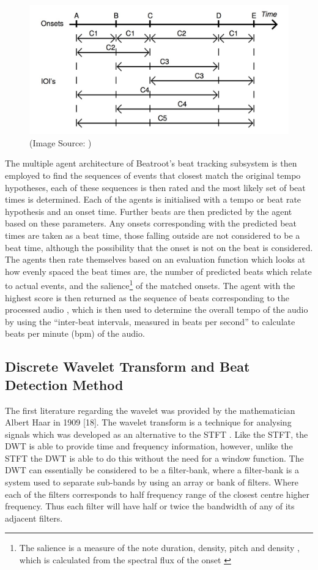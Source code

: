 \documentclass[a4paper, 11pt]{article}
\begin{document}
\begin{figure}[ht]
	\centering
	\includegraphics[scale=0.25]{br-clusters}
	\caption{(Image Source: \cite{dixon4})}
	\label{fig: br-clusters}
\end{figure}

The multiple agent architecture of Beatroot's beat tracking subsystem is then employed to find the sequences of events that closest match the original tempo hypotheses, each of these sequences is then rated and the most likely set of beat times is determined. Each of the agents is initialised with a tempo or beat rate hypothesis and an onset time. Further beats are then predicted by the agent based on these parameters. Any onsets corresponding with the predicted beat times are taken as a beat time, those falling outside are not considered to be a beat time, although the possibility that the onset is not on the beat is considered. The agents then rate themselves based on an evaluation function which looks at how evenly spaced the beat times are, the number of predicted beats which relate to actual events, and the salience\footnote{The salience is a measure of the note duration, density, pitch and density \cite{dixon1}, which is calculated from the spectral flux of the onset \cite{dixon4}} of the matched onsets. The agent with the highest score is then returned as the sequence of beats corresponding to the processed audio \cite{dixon4}, which is then used to determine the overall tempo of the audio by using the ``inter-beat intervals, measured in beats per second'' \cite{dixon1} to calculate beats per minute (bpm) of the audio.


\subsection{Discrete Wavelet Transform and Beat Detection Method}
The first literature regarding the wavelet was provided by the mathematician Albert Haar in 1909 [18]. The wavelet transform is a technique for analysing signals which was developed as an alternative to the STFT \cite{tzane1}. Like the STFT, the DWT is able to provide time and frequency information, however, unlike the STFT the DWT is able to do this without the need for a window function. The DWT can essentially be considered to be a filter-bank, where a filter-bank is a system used to separate sub-bands by using an array or bank of filters. Where each of the filters corresponds to half frequency range of the closest centre higher frequency. Thus each filter will have half or twice the bandwidth of any of its adjacent filters. 
\end{document}
